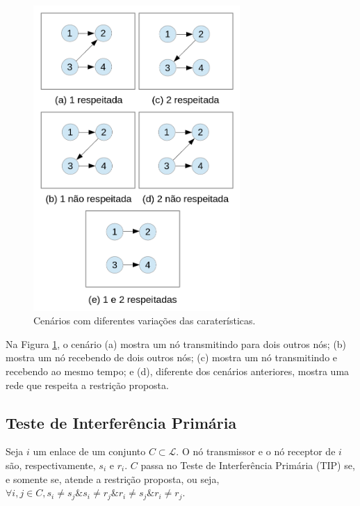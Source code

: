 \begin{figure}[htb]
\centering
\includegraphics[width=0.7\textwidth]{figs/primario}
\caption[Cenários com diferentes variações das caraterísticas.]
{Cenários com diferentes variações das caraterísticas.}
\label{fig:primario}
\end{figure}

Na Figura \ref{fig:primario}, o cenário (a) mostra um nó transmitindo para dois outros nós; (b) mostra um nó recebendo de dois outros nós; (c) mostra um nó transmitindo e recebendo ao mesmo tempo; e (d), diferente dos cenários anteriores, mostra uma rede que respeita a restrição proposta.   

\subsection{Teste de Interferência Primária}

Seja $i$ um enlace de um conjunto $C \subset \mathcal{L}$. O nó transmissor e o nó receptor de $i$ são, respectivamente, $s_{i}$ e $r_{i}$. $C$ passa no Teste de Interferência Primária (TIP) se, e somente se, atende a restrição proposta, ou seja, $\forall i,j \in C, s_{i} \neq s_{j} \& s_{i} \neq r_{j} \& r_{i} \neq s_{j} \& r_{i} \neq r_{j}$. 

